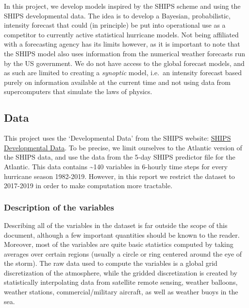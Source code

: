 \documentclass[
]{article}
\begin{document}
In this project, we develop models inspired by the SHIPS scheme and
using the SHIPS developmental data. The idea is to develop a Bayesian,
probabilistic, intensity forecast that could (in principle) be put into
operational use as a competitor to currently active statistical
hurricane models. Not being affiliated with a forecasting agency has its
limits however, as it is important to note that the SHIPS model also
uses information from the numerical weather forecasts run by the US
government. We do not have access to the global forecast models, and as
such are limited to creating a \emph{synoptic} model, i.e.~an intensity
forecast based purely on information available at the current time and
not using data from supercomputers that simulate the laws of physics.

\hypertarget{data}{%
\subsection{Data}\label{data}}

This project uses the `Developmental Data' from the SHIPS website:
\href{http://rammb.cira.colostate.edu/research/tropical_cyclones/ships/developmental_data.asp}{SHIPS
Developmental Data}. To be precise, we limit ourselves to the Atlantic
version of the SHIPS data, and use the data from the 5-day SHIPS
predictor file for the Atlantic. This data contains \textasciitilde140
variables in 6-hourly time steps for every hurricane season 1982-2019.
However, in this report we restrict the dataset to 2017-2019 in order to
make computation more tractable.

\hypertarget{description-of-the-variables}{%
\subsubsection{Description of the
variables}\label{description-of-the-variables}}

Describing all of the variables in the dataset is far outside the scope
of this document, although a few important quantities should be known to
the reader. Moreover, most of the variables are quite basic statistics
computed by taking averages over certain regions (usually a circle or
ring centered around the eye of the storm). The raw data used to compute
the variables is a global grid discretization of the atmosphere, while
the gridded discretization is created by statistically interpolating
data from satellite remote sensing, weather balloons, weather stations,
commercial/military aircraft, as well as weather buoys in the sea.
\end{document}
